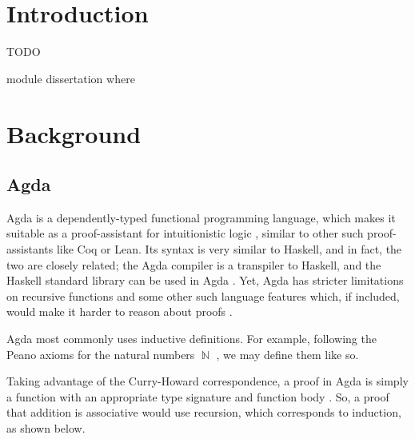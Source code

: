 \documentclass[logo,bsc,singlespacing,parskip,online]{infthesis}
\DeclareMathOperator{\nat}{\mathbb{N}}
\renewenvironment{code}{\mintedcopy[breaklines,breaksymbolleft=\;]{agda}}{\endmintedcopy}
\begin{document}
\chapter{Introduction}

TODO

\begin{code}
module dissertation where
\end{code}

\chapter{Background}

\section{Agda}
Agda is a dependently-typed functional programming language, which makes it
suitable as a proof-assistant for intuitionistic logic
\citep{norell_towards_2007}, similar to other such proof-assistants like Coq or
Lean. Its syntax is very similar to Haskell, and in fact, the two are closely
related; the Agda compiler is a transpiler to Haskell, and the Haskell standard
library can be used in Agda \citep{kusee_compiling_2017}. Yet, Agda has stricter
limitations on recursive functions and some other such language features which,
if included, would make it harder to reason about proofs
\citep{berghofer_brief_2009}.

Agda most commonly uses inductive definitions. For example, following the Peano
axioms for the natural numbers $\nat$ \citep{boolos_freges_1995}, we may define
them like so.



Taking advantage of the Curry-Howard correspondence, a proof in Agda is simply a
function with an appropriate type signature and function body
\citep{wadler_propositions_2015}. So, a proof that addition is associative would
use recursion, which corresponds to induction, as shown below.


\end{document}

